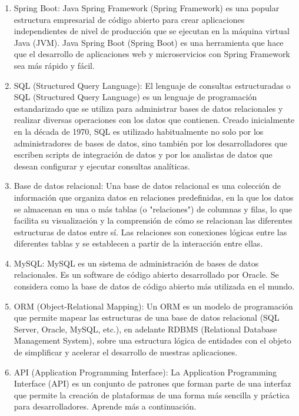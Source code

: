 \begin{enumerate}
    \item Spring Boot: Java Spring Framework (Spring Framework) es una popular estructura empresarial de código abierto para crear aplicaciones independientes de nivel de producción que se ejecutan en la máquina virtual Java (JVM).
    Java Spring Boot (Spring Boot) es una herramienta que hace que el desarrollo de aplicaciones web y microservicios con Spring Framework sea más rápido y fácil.\citep{ibmQuJava}
    \item SQL (Structured Query Language): El lenguaje de consultas estructuradas o SQL (Structured Query Language) es un lenguaje de programación estandarizado que se utiliza para administrar bases de datos relacionales y realizar diversas operaciones con los datos que contienen. Creado inicialmente en la década de 1970, SQL es utilizado habitualmente no solo por los administradores de bases de datos, sino también por los desarrolladores que escriben scripts de integración de datos y por los analistas de datos que desean configurar y ejecutar consultas analíticas.\citep{computerweeklyQuStructured}
    \item Base de datos relacional: Una base de datos relacional es una colección de información que organiza datos en relaciones predefinidas, en la que los datos se almacenan en una o más tablas (o "relaciones") de columnas y filas, lo que facilita su visualización y la comprensión de cómo se relacionan las diferentes estructuras de datos entre sí. Las relaciones son conexiones lógicas entre las diferentes tablas y se establecen a partir de la interacción entre ellas.\citep{googleQuBase}
    \item MySQL: MySQL es un sistema de administración de bases de datos relacionales. Es un software de código abierto desarrollado por Oracle. Se considera como la base de datos de código abierto más utilizada en el mundo.\citep{hubspotMySQLPara}
    \item ORM (Object-Relational Mapping): Un ORM es un modelo de programación que permite mapear las estructuras de una base de datos relacional (SQL Server, Oracle, MySQL, etc.), en adelante RDBMS (Relational Database Management System), sobre una estructura lógica de entidades con el objeto de simplificar y acelerar el desarrollo de nuestras aplicaciones.\citep{deloitteQuORM}
    \item API (Application Programming Interface): La Application Programming Interface (API) es un conjunto de patrones que forman parte de una interfaz que permite la creación de plataformas de una forma más sencilla y práctica para desarrolladores. Aprende más a continuación.\citep{deloitteQuORM}

\end{enumerate}
